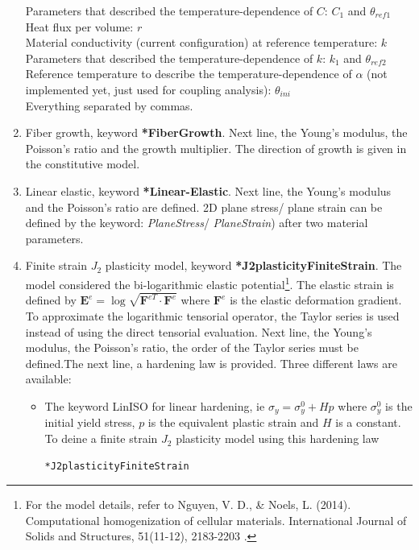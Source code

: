 \documentclass[oneside,11pt,times]{book}
\begin{document}
\begin{enumerate}
Parameters that described the temperature-dependence of $C$: $C_1$ and $\theta_{ref1}$\\
Heat flux per volume: $r$\\
Material conductivity (current configuration) at reference temperature: $k$ \\
Parameters that described the temperature-dependence of $k$: $k_1$ and $\theta_{ref2}$\\
Reference temperature to describe the temperature-dependence of $\alpha$ (not implemented yet, just used for coupling analysis): $\theta_{ini}$
\\
Everything separated by commas.
\item Fiber growth, keyword \textbf{*FiberGrowth}. Next line, the Young's modulus, the Poisson's ratio and the growth multiplier. The direction of growth is given in the constitutive model.
\item Linear elastic, keyword \textbf{*Linear-Elastic}. Next line, the Young's modulus and the Poisson's ratio are defined. 2D plane stress/ plane strain can be defined by the keyword:  \textit{PlaneStress}/ \textit{PlaneStrain}) after two material parameters.
\item Finite strain $J_2$ plasticity model, keyword  \textbf{*J2plasticityFiniteStrain}. The model considered the bi-logarithmic elastic potential\footnote{For the model details, refer to Nguyen, V. D., \& Noels, L. (2014). Computational homogenization of cellular materials. International Journal of Solids and Structures, 51(11-12), 2183-2203 .}. The elastic strain is defined by $\mathbf{E}^e = \log\sqrt{\mathbf{F}^{eT}\cdot \mathbf{F}^{e}}$ where $\mathbf{F}^{e}$ is the elastic deformation gradient. To approximate the logarithmic tensorial operator, the Taylor series is used instead of using the direct tensorial evaluation. Next line, the Young's modulus, the Poisson's ratio, the order of the Taylor series must be defined.The next line, a hardening law is provided. Three different laws are available: 
\begin{itemize}
    \item The keyword LinISO for linear hardening, ie $\sigma_y =\sigma_y^0+ H p$ where $\sigma_y^0$ is the initial yield stress, $p$ is the equivalent plastic strain and  $H$ is a constant. To deine a finite strain $J_2$ plasticity model using this hardening law
    \begin{lstlisting}[mathescape=true]
*J2plasticityFiniteStrain

\end{lstlisting}
\end{itemize}
\end{enumerate}
\end{document}
